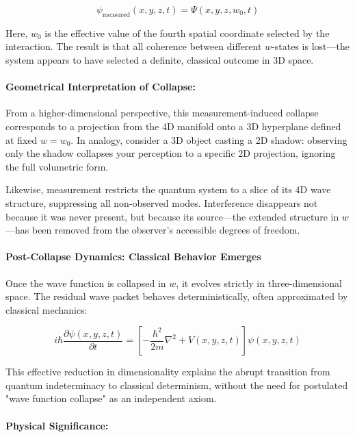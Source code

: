 \documentclass[12pt]{article}
\begin{document}
\begin{equation}
\psi_{\text{measured}}(x, y, z, t) = \Psi(x, y, z, w_0, t)
\end{equation}

Here, \( w_0 \) is the effective value of the fourth spatial coordinate selected by the interaction. The result is that all coherence between different \( w \)-states is lost—the system appears to have selected a definite, classical outcome in 3D space.

\paragraph{Geometrical Interpretation of Collapse:}

From a higher-dimensional perspective, this measurement-induced collapse corresponds to a projection from the 4D manifold onto a 3D hyperplane defined at fixed \( w = w_0 \). In analogy, consider a 3D object casting a 2D shadow: observing only the shadow collapses your perception to a specific 2D projection, ignoring the full volumetric form.

Likewise, measurement restricts the quantum system to a slice of its 4D wave structure, suppressing all non-observed modes. Interference disappears not because it was never present, but because its source—the extended structure in \( w \)—has been removed from the observer’s accessible degrees of freedom.

\paragraph{Post-Collapse Dynamics: Classical Behavior Emerges}

Once the wave function is collapsed in \( w \), it evolves strictly in three-dimensional space. The residual wave packet behaves deterministically, often approximated by classical mechanics:

\begin{equation}
i\hbar \frac{\partial \psi(x, y, z, t)}{\partial t} = \left[ -\frac{\hbar^2}{2m} \nabla^2 + V(x, y, z, t) \right] \psi(x, y, z, t)
\end{equation}

This effective reduction in dimensionality explains the abrupt transition from quantum indeterminacy to classical determinism, without the need for postulated "wave function collapse" as an independent axiom.

\paragraph{Physical Significance:}
\end{document}
